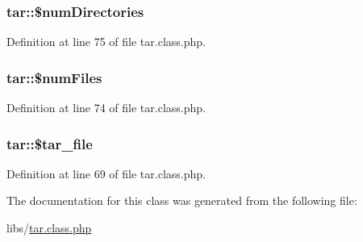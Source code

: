 \hypertarget{classtar_a2406f376692c41ad3e3a62cf473738ec}{}
\subsubsection[{\$num\+Directories}]{\setlength{\rightskip}{0pt plus 5cm}tar\+::\$num\+Directories}\label{classtar_a2406f376692c41ad3e3a62cf473738ec}


Definition at line 75 of file tar.\+class.\+php.

\hypertarget{classtar_a03d688d94a5fa92720ff9b1c03e7c157}{}
\subsubsection[{\$num\+Files}]{\setlength{\rightskip}{0pt plus 5cm}tar\+::\$num\+Files}\label{classtar_a03d688d94a5fa92720ff9b1c03e7c157}


Definition at line 74 of file tar.\+class.\+php.

\hypertarget{classtar_afea782413237d583b7611a1c5410f2c5}{}
\subsubsection[{\$tar\+\_\+file}]{\setlength{\rightskip}{0pt plus 5cm}tar\+::\$tar\+\_\+file}\label{classtar_afea782413237d583b7611a1c5410f2c5}


Definition at line 69 of file tar.\+class.\+php.



The documentation for this class was generated from the following file\+:\begin{DoxyCompactItemize}
\item 
libs/\hyperlink{tar_8class_8php}{tar.\+class.\+php}\end{DoxyCompactItemize}
